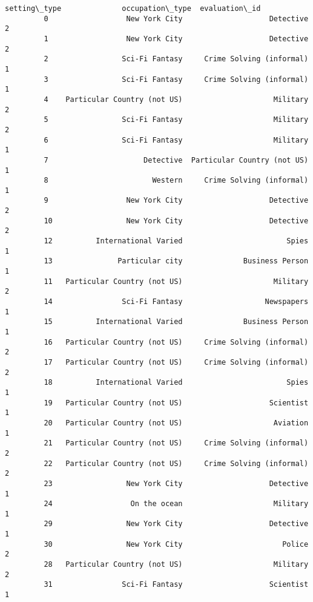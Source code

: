 \documentclass[11pt]{article}
\begin{document}
\begin{Verbatim}[commandchars=\\\{\}]
                             setting\_type              occupation\_type  evaluation\_id  
         0                  New York City                    Detective              2  
         1                  New York City                    Detective              2  
         2                 Sci-Fi Fantasy     Crime Solving (informal)              1  
         3                 Sci-Fi Fantasy     Crime Solving (informal)              1  
         4    Particular Country (not US)                     Military              2  
         5                 Sci-Fi Fantasy                     Military              2  
         6                 Sci-Fi Fantasy                     Military              1  
         7                      Detective  Particular Country (not US)              1  
         8                        Western     Crime Solving (informal)              1  
         9                  New York City                    Detective              2  
         10                 New York City                    Detective              2  
         12          International Varied                        Spies              1  
         13               Particular city              Business Person              1  
         11   Particular Country (not US)                     Military              2  
         14                Sci-Fi Fantasy                   Newspapers              1  
         15          International Varied              Business Person              1  
         16   Particular Country (not US)     Crime Solving (informal)              2  
         17   Particular Country (not US)     Crime Solving (informal)              2  
         18          International Varied                        Spies              1  
         19   Particular Country (not US)                    Scientist              1  
         20   Particular Country (not US)                     Aviation              1  
         21   Particular Country (not US)     Crime Solving (informal)              2  
         22   Particular Country (not US)     Crime Solving (informal)              2  
         23                 New York City                    Detective              1  
         24                  On the ocean                     Military              1  
         29                 New York City                    Detective              1  
         30                 New York City                       Police              2  
         28   Particular Country (not US)                     Military              2  
         31                Sci-Fi Fantasy                    Scientist              1  

\end{Verbatim}
\end{document}
